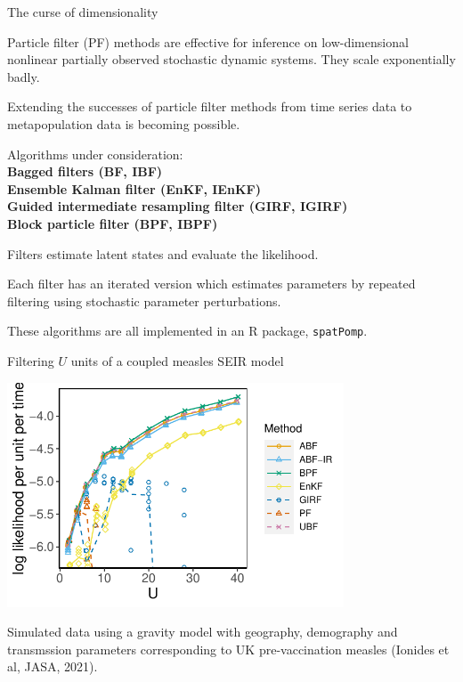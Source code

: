 \documentclass{beamer}
\begin{document}
\begin{frame}{The curse of dimensionality}

  \bi
  \item
    Particle filter (PF) methods are effective for inference on low-dimensional nonlinear partially observed stochastic dynamic systems. They scale exponentially badly.

\item Extending the successes of particle filter methods from time series data to metapopulation data is becoming possible.

\item Algorithms under consideration:\\
  {\bf
  Bagged filters (BF, IBF)\\
  Ensemble Kalman filter (EnKF, IEnKF)\\
  Guided intermediate resampling filter (GIRF, IGIRF)\\
  Block particle filter (BPF, IBPF)\\
  }
  
\item Filters estimate latent states and evaluate the likelihood.
\item Each filter has an iterated version which estimates parameters by repeated filtering using stochastic parameter perturbations.

\item These algorithms are all implemented in an R package, \texttt{spatPomp}.
  
  \ei
  
\end{frame}

\begin{frame}{Filtering $U$ units of a coupled measles SEIR model}

\vspace{-3mm}

\begin{center}
\includegraphics[width=10cm]{mscale_loglik_plot-1.pdf}


\end{center}

\vspace{-2mm}

Simulated data using a gravity model with geography, demography and transmssion parameters corresponding to UK pre-vaccination measles (Ionides et al, {JASA}, 2021).


\end{frame}
\end{document}

